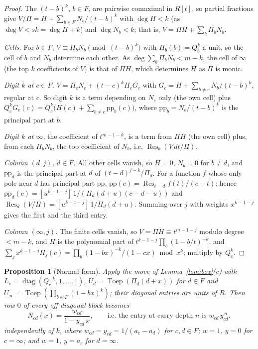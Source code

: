 \documentclass[11pt]{amsart}
\newtheorem{proposition}[theorem]{Proposition}
\theoremstyle{definition}
\theoremstyle{plain}
\begin{document}
\begin{proof}
The $(t-b)^k$, $b\in F$, are pairwise comaximal in $R[t]$, so partial fractions give $V/\Pi=H+\sum_{b\in F}N_b/(t-b)^k$ with $\deg H<k$ (as $\deg V<sk=\deg\Pi+k$) and $\deg N_b<k$; that is, $V=\Pi H+\sum_b\Pi_bN_b$.

\emph{Cells.} For $b\in F$, $V\equiv\Pi_bN_b\pmod{(t-b)^k}$ with $\Pi_b(b)=Q_b^k$ a unit, so the cell of $b$ and $N_b$ determine each other. As $\deg\sum_b\Pi_bN_b<m-k$, the cell of $\infty$ (the top $k$ coefficients of $V$) is that of $\Pi H$, which determines $H$ as $\Pi$ is monic.

\emph{Digit $k$ at $c\in F$.} $V=\Pi_cN_c+(t-c)^k\Pi_cG_c$ with $G_c=H+\sum_{b\ne c}N_b/(t-b)^k$, regular at $c$. So digit $k$ is a term depending on $N_c$ only (the own cell) plus $Q_c^kG_c(c)=Q_c^k\bigl(H(c)+\sum_{b\ne c}\mathrm{pp}_b(c)\bigr)$, where $\mathrm{pp}_b=N_b/(t-b)^k$ is the principal part at $b$.

\emph{Digit $k$ at $\infty$}, the coefficient of $t^{m-1-k}$, is a term from $\Pi H$ (the own cell) plus, from each $\Pi_bN_b$, the top coefficient of $N_b$, i.e. $\operatorname{Res}_b(V\,dt/\Pi)$.

\emph{Column $(d,j)$, $d\in F$.} All other cells vanish, so $H=0$, $N_b=0$ for $b\ne d$, and $\mathrm{pp}_d$ is the principal part at $d$ of $(t-d)^{j-k}/\Pi_d$. For a function $f$ whose only pole near $d$ has principal part $\mathrm{pp}$, $\mathrm{pp}(c)=\operatorname{Res}_{t=d}f(t)/(c-t)$; hence $\mathrm{pp}_d(c)=[u^{k-1-j}]\,1/(\Pi_d(d+u)(c-d-u))$ and $\operatorname{Res}_d(V/\Pi)=[u^{k-1-j}]\,1/\Pi_d(d+u)$. Summing over $j$ with weights $x^{k-1-j}$ gives the first and the third entry.

\emph{Column $(\infty,j)$.} The finite cells vanish, so $V=\Pi H\equiv t^{m-1-j}$ modulo degree $<m-k$, and $H$ is the polynomial part of $t^{k-1-j}\prod_b(1-b/t)^{-k}$, and $\sum_jx^{k-1-j}H_j(c)=\prod_b(1-bx)^{-k}/(1-cx)\bmod x^k$; multiply by $Q_c^k$.
\end{proof}

\begin{proposition}[Normal form]\label{prop:Ns}
Apply the move of Lemma~\ref{lem:box}(c) with $L_c=\operatorname{diag}(Q_c^{-k},1,\dots,1)$, $U_d=\operatorname{Toep}(\Pi_d(d+x))$ for $d\in F$ and $U_\infty=\operatorname{Toep}(\prod_{b\in F}(1-bx)^k)$; their diagonal entries are units of $R$. Then row $0$ of every off-diagonal block becomes
\[
N_{cd}(x)=\frac{w_{cd}}{1-y_{cd}\,x},\qquad\text{i.e. the entry at carry depth $n$ is }w_{cd}\,y_{cd}^{\,n},
\]
independently of $k$, where $w_{cd}=y_{cd}=1/(a_c-a_d)$ for $c,d\in F$; $w=1$, $y=0$ for $c=\infty$; and $w=1$, $y=a_c$ for $d=\infty$.
\end{proposition}
\end{document}

